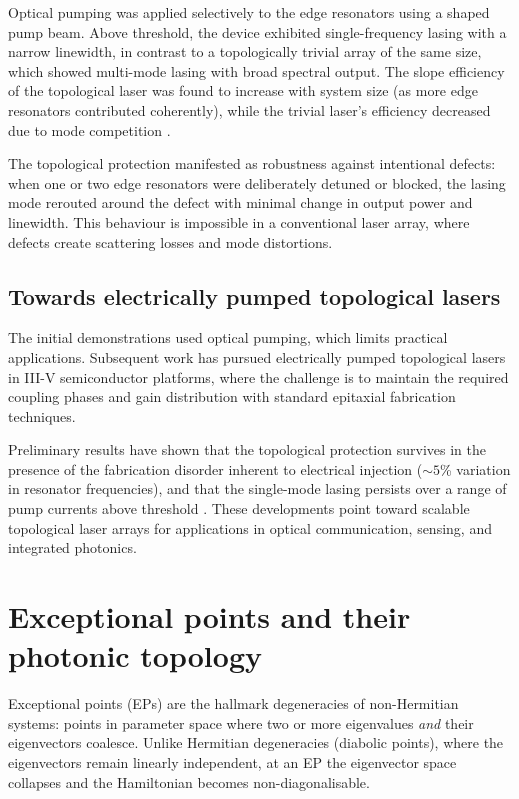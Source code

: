 Optical pumping was applied selectively to the edge resonators using
a shaped pump beam.  Above threshold, the device exhibited
single-frequency lasing with a narrow linewidth, in contrast to a
topologically trivial array of the same size, which showed
multi-mode lasing with broad spectral output.  The slope efficiency
of the topological laser was found to increase with system size (as
more edge resonators contributed coherently), while the trivial
laser's efficiency decreased due to mode competition
\cite{bandres2018topologicala,harari2018topological}.

The topological protection manifested as robustness against
intentional defects: when one or two edge resonators were
deliberately detuned or blocked, the lasing mode rerouted around the
defect with minimal change in output power and linewidth.  This
behaviour is impossible in a conventional laser array, where defects
create scattering losses and mode distortions.

\subsection{Towards electrically pumped topological lasers}
\label{sec:ch17-electrical-pumping}

The initial demonstrations used optical pumping, which limits
practical applications.  Subsequent work has pursued electrically
pumped topological lasers in III-V semiconductor platforms, where
the challenge is to maintain the required coupling phases and gain
distribution with standard epitaxial fabrication techniques.

Preliminary results have shown that the topological protection
survives in the presence of the fabrication disorder inherent to
electrical injection ($\sim 5$\% variation in resonator frequencies),
and that the single-mode lasing persists over a range of pump
currents above threshold
\cite{ozawa2018topological,price2022roadmap}.  These developments
point toward scalable topological laser arrays for applications in
optical communication, sensing, and integrated photonics.

\section{Exceptional points and their photonic topology}
\label{sec:ch17-exceptional-points}

Exceptional points (EPs) are the hallmark degeneracies of
non-Hermitian systems: points in parameter space where two or more
eigenvalues \emph{and} their eigenvectors coalesce.  Unlike Hermitian
degeneracies (diabolic points), where the eigenvectors remain linearly
independent, at an EP the eigenvector space collapses and the
Hamiltonian becomes non-diagonalisable.

